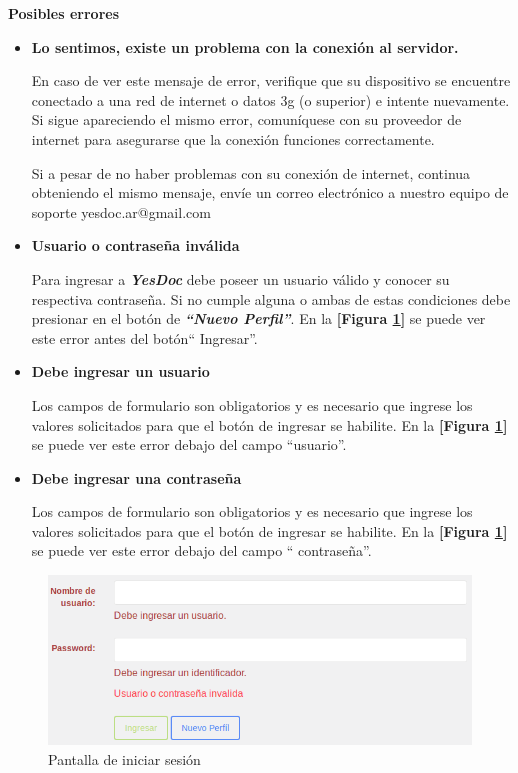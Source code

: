 \textbf{Posibles errores}
\begin{itemize}
	\item \textbf{Lo sentimos, existe un problema con la conexión al servidor.}
	
	En caso de ver este mensaje de error, verifique que su dispositivo se encuentre conectado a una red de internet o datos 3g (o superior) e intente nuevamente. Si sigue apareciendo el mismo error, comuníquese con su proveedor de internet para asegurarse que la conexión funciones correctamente.
	
	Si a pesar de no haber problemas con su conexión de internet, continua obteniendo el mismo mensaje, envíe un correo electrónico a nuestro equipo de soporte yesdoc.ar@gmail.com
	
	\item \textbf{Usuario o contraseña inválida}
	
	Para ingresar a \textbf{\textit{YesDoc}} debe poseer un usuario válido y conocer su respectiva contraseña. Si no cumple alguna o ambas de estas condiciones debe presionar en el botón de \textbf{\textit{``Nuevo Perfil''}}. En la \textbf{[Figura \ref{mu-us_invalido_ingresar_caracteres}]} se puede ver este error antes del botón`` Ingresar''.
	
	\item \textbf{Debe ingresar un usuario}
	
	Los campos de formulario son obligatorios y es necesario que ingrese los valores solicitados para que el botón de ingresar se habilite. En la \textbf{[Figura \ref{mu-us_invalido_ingresar_caracteres}]} se puede ver este error debajo del campo ``usuario''.
	
	\item \textbf{Debe ingresar una contraseña}
	
	Los campos de formulario son obligatorios y es necesario que ingrese los valores solicitados para que el botón de ingresar se habilite.	 En la \textbf{[Figura \ref{mu-us_invalido_ingresar_caracteres}]} se puede ver este error debajo del campo `` contraseña''.
\end{itemize}
 \begin{figure}
 	\centering
 	\includegraphics[width=.8\textwidth]{img/manual_de_usuario/us_invalido_ingresar_caracteres}
 	\caption{Pantalla de iniciar sesión}
 	\label{mu-us_invalido_ingresar_caracteres}
 \end{figure}


